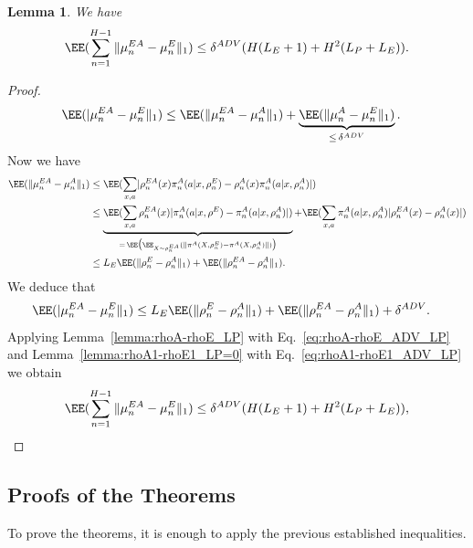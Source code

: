 \documentclass{article}
\theoremstyle{plain}
\newtheorem{lemma}[theorem]{Lemma}
\begin{document}
\begin{lemma}
    \label{lemma:muEA-muEE_ADV_LP}
    We have 
    \begin{equation}
        \label{eq:muEA-muEE_ADV_LP}
        \EE(\sum_{n=1}^{H-1} \|\mu_n^{EA} - \mu_n^E \|_1) \leq \delta^{ADV}(H(L_E +1) + H^2(L_P + L_E)).
    \end{equation}
\end{lemma}
\begin{proof}
    \begin{align*}
        \EE(|\mu_n^{EA} - \mu_n^E \|_1) &\leq \EE(\|\mu_n^{EA} - \mu_n^A \|_1) + \underbrace{\EE(\|\mu_n^{A} - \mu_n^E \|_1)}_{\leq\,\delta^{ADV}}.
    \end{align*}
    Now we have 
    \begin{align*}
        \EE(\|\mu_n^{EA} - \mu_n^A \|_1) &\leq  \EE(\sum_{x,a} \lvert\rho^{EA}_{n}(x)\pi^A_n(a\vert x, \rho^E_n) - \rho^{A}_{n}(x)\pi^A_n(a\vert x, \rho^A_n) \rvert) \\
         &\leq  \underbrace{\EE(\sum_{x,a} \rho^{EA}_{n}(x)\lvert\pi^A_n(a\vert x, \rho^E) - \pi^A_n(a\vert x, \rho^A_n)\vert  )}_{=\, \EE\big(\EE_{X\sim\rho_n^{EA}}(\|\pi^A(X, \rho_n^E) - \pi^A(X, \rho_n^A)\|)\big)}+ \EE(\sum_{x,a} \pi^A_n(a\vert x, \rho^A_n)\vert\rho^{EA}_{n}(x) - \rho^{A}_{n}(x)\vert) \\
         &\leq L_E\EE(\|\rho^E_n - \rho^A_n\|_1) + \EE(\|\rho^{EA}_n - \rho^A_n\|_1).
    \end{align*}
    We deduce that 
    \begin{align*}
        \EE(|\mu_n^{EA} - \mu_n^E \|_1) &\leq L_E\EE(\|\rho^E_n - \rho^A_n\|_1) + \EE(\|\rho^{EA}_n - \rho^A_n\|_1) + \delta^{ADV}.
    \end{align*}
    Applying Lemma~\ref{lemma:rhoA-rhoE_LP} with Eq.~\eqref{eq:rhoA-rhoE_ADV_LP} and Lemma~\ref{lemma:rhoA1-rhoE1_LP=0} with Eq.~\eqref{eq:rhoA1-rhoE1_ADV_LP} we obtain
    \begin{align*}
        \EE(\sum_{n=1}^{H-1} \|\mu_n^{EA} - \mu_n^E \|_1) \leq  \delta^{ADV}(H(L_E +1) + H^2(L_P + L_E)),
    \end{align*}
\end{proof}

\subsection{Proofs of the Theorems}

To prove the theorems, it is enough to apply the previous established inequalities. 
\end{document}
